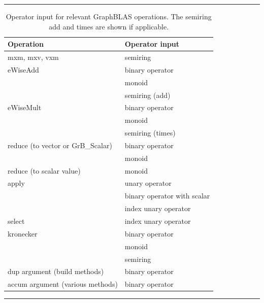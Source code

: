 \begin{table}[t]
    \hrule
    \begin{center}
        \caption{Operator input for relevant GraphBLAS operations. 
        The semiring add and times are shown if applicable.}
        \label{Tab:OperatorInputType}
        \begin{tabular}{l|l}
        Operation                       & Operator input        \\ \hline
        {\sf mxm, mxv, vxm}             & semiring              \\ \hline
        {\sf eWiseAdd}                  & binary operator       \\
                                        & monoid                \\
                                        & semiring (add)        \\ \hline
        {\sf eWiseMult}                 & binary operator       \\
                                        & monoid                \\
                                        & semiring (times)      \\ \hline
       {\sf reduce} (to vector or {\sf GrB\_Scalar})  & binary operator    \\ 
                                        & monoid                \\ \hline
       {\sf reduce} (to scalar value)   & monoid                \\ \hline
       {\sf apply}                      & unary operator        \\
	                                    & binary operator with scalar \\
                                        & index unary operator  \\ \hline
       {\sf select}                     & index unary operator  \\ \hline
       {\sf kronecker}                  & binary operator       \\
                                        & monoid                \\
                                        & semiring              \\ \hline
       {\sf dup} argument (build methods)     & binary operator \\ \hline
       {\sf accum} argument (various methods) & binary operator \\
       \end{tabular}
    \end{center}
    \hrule
\end{table}

